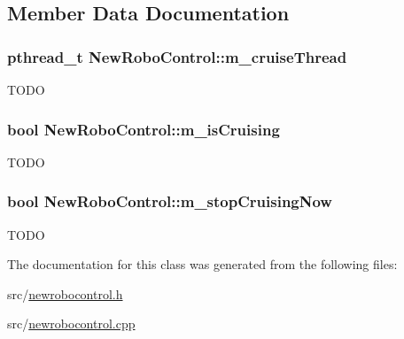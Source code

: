 \subsection{Member Data Documentation}
\hypertarget{classNewRoboControl_a285a033aa3238a589d78243ce7cdb620}{
\subsubsection[{m\_\-cruiseThread}]{\setlength{\rightskip}{0pt plus 5cm}pthread\_\-t {\bf NewRoboControl::m\_\-cruiseThread}}}
\label{classNewRoboControl_a285a033aa3238a589d78243ce7cdb620}
TODO \hypertarget{classNewRoboControl_aa83c55c4b75ef04c909038e2ad581e3b}{
\subsubsection[{m\_\-isCruising}]{\setlength{\rightskip}{0pt plus 5cm}bool {\bf NewRoboControl::m\_\-isCruising}}}
\label{classNewRoboControl_aa83c55c4b75ef04c909038e2ad581e3b}
TODO \hypertarget{classNewRoboControl_a2f7afe3fa8d85f8fedf05ba12ec21f32}{
\subsubsection[{m\_\-stopCruisingNow}]{\setlength{\rightskip}{0pt plus 5cm}bool {\bf NewRoboControl::m\_\-stopCruisingNow}}}
\label{classNewRoboControl_a2f7afe3fa8d85f8fedf05ba12ec21f32}
TODO 

The documentation for this class was generated from the following files:\begin{DoxyCompactItemize}
\item 
src/\hyperlink{newrobocontrol_8h}{newrobocontrol.h}\item 
src/\hyperlink{newrobocontrol_8cpp}{newrobocontrol.cpp}\end{DoxyCompactItemize}

